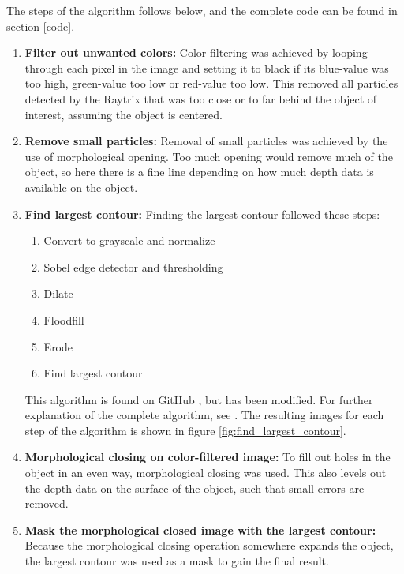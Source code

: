 The steps of the algorithm follows below, and the complete code can be found in section \ref{code}.
\newpage

\begin{enumerate}
    \item \textbf{Filter out unwanted colors:}
    Color filtering was achieved by looping through each pixel in the image and setting it to black if its blue-value was too high, green-value too low or red-value too low. This removed all particles detected by the Raytrix that was too close or to far behind the object of interest, assuming the object is centered.
    
    \item \textbf{Remove small particles:}
    Removal of small particles was achieved by the use of morphological opening. Too much opening would remove much of the object, so here there is a fine line depending on how much depth data is available on the object.
    
    \item \textbf{Find largest contour:} 
    Finding the largest contour followed these steps: 
    \begin{enumerate}[label*=\arabic*.]
        \item Convert to grayscale and normalize
        \item Sobel edge detector and thresholding
        \item Dilate
        \item Floodfill
        \item Erode
        \item Find largest contour
    \end{enumerate}
    This algorithm is found on GitHub \cite{website:largest_contour_code_github}, but has been modified. For further explanation of the complete algorithm, see \cite{website:largest_contour_code_explanation}.
    The resulting images for each step of the algorithm is shown in figure \ref{fig:find_largest_contour}.
    
    \item \textbf{Morphological closing on color-filtered image:}
    To fill out holes in the object in an even way, morphological closing was used. This also levels out the depth data on the surface of the object, such that small errors are removed.
    
    \item \textbf{Mask the morphological closed image with the largest contour:}
    Because the morphological closing operation somewhere expands the object, the largest contour was used as a mask to gain the final result. 
\end{enumerate}

